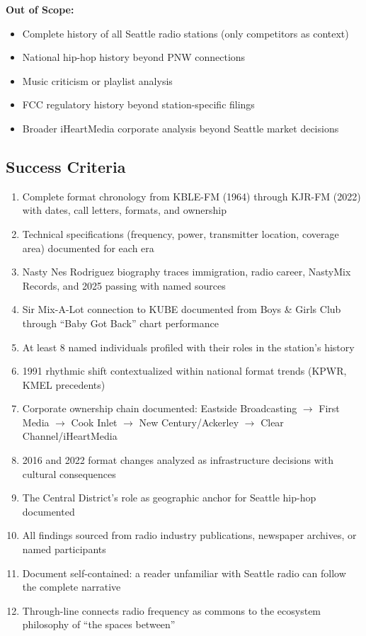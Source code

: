 \documentclass[11pt,letterpaper]{article}
\begin{document}
\textbf{Out of Scope:}
\begin{itemize}[leftmargin=2em]
\item Complete history of all Seattle radio stations (only competitors as context)
\item National hip-hop history beyond PNW connections
\item Music criticism or playlist analysis
\item FCC regulatory history beyond station-specific filings
\item Broader iHeartMedia corporate analysis beyond Seattle market decisions
\end{itemize}

\subsection{Success Criteria}

\begin{enumerate}[leftmargin=2em]
\item Complete format chronology from KBLE-FM (1964) through KJR-FM (2022) with dates, call letters, formats, and ownership
\item Technical specifications (frequency, power, transmitter location, coverage area) documented for each era
\item Nasty Nes Rodriguez biography traces immigration, radio career, NastyMix Records, and 2025 passing with named sources
\item Sir Mix-A-Lot connection to KUBE documented from Boys \& Girls Club through ``Baby Got Back'' chart performance
\item At least 8 named individuals profiled with their roles in the station's history
\item 1991 rhythmic shift contextualized within national format trends (KPWR, KMEL precedents)
\item Corporate ownership chain documented: Eastside Broadcasting $\rightarrow$ First Media $\rightarrow$ Cook Inlet $\rightarrow$ New Century/Ackerley $\rightarrow$ Clear Channel/iHeartMedia
\item 2016 and 2022 format changes analyzed as infrastructure decisions with cultural consequences
\item The Central District's role as geographic anchor for Seattle hip-hop documented
\item All findings sourced from radio industry publications, newspaper archives, or named participants
\item Document self-contained: a reader unfamiliar with Seattle radio can follow the complete narrative
\item Through-line connects radio frequency as commons to the ecosystem philosophy of ``the spaces between''
\end{enumerate}
\end{document}
